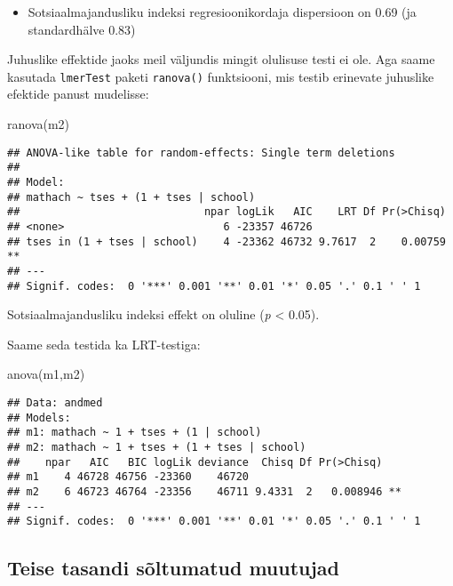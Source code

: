 \documentclass[
]{book}
\newenvironment{Shaded}{\begin{snugshade}}{\end{snugshade}}
\newcommand{\FunctionTok}[1]{\textcolor[rgb]{0.00,0.00,0.00}{#1}}
\newcommand{\NormalTok}[1]{#1}
\providecommand{\tightlist}{%
  \setlength{\itemsep}{0pt}\setlength{\parskip}{0pt}}
\begin{document}
\begin{itemize}
\tightlist
\item
  Sotsiaalmajandusliku indeksi regresioonikordaja dispersioon on 0.69 (ja standardhälve 0.83)
\end{itemize}

Juhuslike effektide jaoks meil väljundis mingit olulisuse testi ei ole. Aga saame kasutada \texttt{lmerTest} paketi \texttt{ranova()} funktsiooni, mis testib erinevate juhuslike efektide panust mudelisse:

\begin{Shaded}
\begin{Highlighting}[]
\FunctionTok{ranova}\NormalTok{(m2)}
\end{Highlighting}
\end{Shaded}

\begin{verbatim}
## ANOVA-like table for random-effects: Single term deletions
## 
## Model:
## mathach ~ tses + (1 + tses | school)
##                             npar logLik   AIC    LRT Df Pr(>Chisq)   
## <none>                         6 -23357 46726                        
## tses in (1 + tses | school)    4 -23362 46732 9.7617  2    0.00759 **
## ---
## Signif. codes:  0 '***' 0.001 '**' 0.01 '*' 0.05 '.' 0.1 ' ' 1
\end{verbatim}

Sotsiaalmajandusliku indeksi effekt on oluline (\emph{p} \textless{} 0.05).

Saame seda testida ka LRT-testiga:

\begin{Shaded}
\begin{Highlighting}[]
\FunctionTok{anova}\NormalTok{(m1,m2)}
\end{Highlighting}
\end{Shaded}

\begin{verbatim}
## Data: andmed
## Models:
## m1: mathach ~ 1 + tses + (1 | school)
## m2: mathach ~ 1 + tses + (1 + tses | school)
##    npar   AIC   BIC logLik deviance  Chisq Df Pr(>Chisq)   
## m1    4 46728 46756 -23360    46720                        
## m2    6 46723 46764 -23356    46711 9.4331  2   0.008946 **
## ---
## Signif. codes:  0 '***' 0.001 '**' 0.01 '*' 0.05 '.' 0.1 ' ' 1
\end{verbatim}

\hypertarget{teise-tasandi-suxf5ltumatud-muutujad}{%
\subsection{Teise tasandi sõltumatud muutujad}\label{teise-tasandi-suxf5ltumatud-muutujad}}
\end{document}
